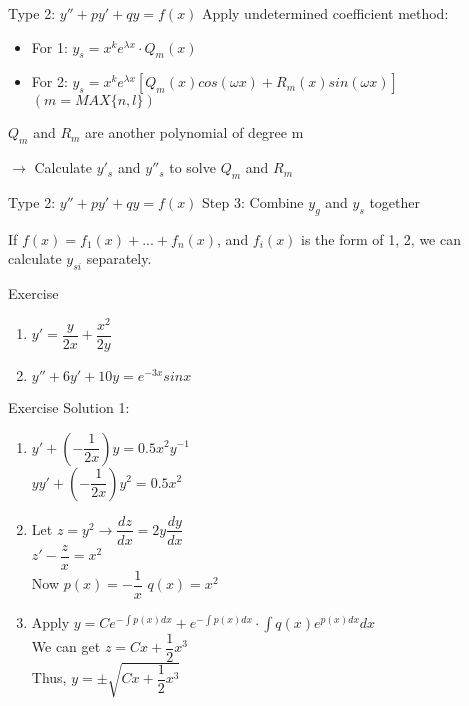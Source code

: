 \begin{frame}{Type 2: $y'' + py' + qy = f(x)$}
    Apply undetermined coefficient method:
    \begin{itemize}
        \item For 1: $y_s = x^k e^{\lambda x}\cdot Q_m(x) $
        \item For 2: $y_s = x^k e^{\lambda x}[Q_m(x)cos(\omega x) + R_m(x) sin(\omega x)]$\
              $(m = MAX\{n ,l\})$
    \end{itemize}
    $Q_m$ and $R_m$ are another polynomial of degree m

    $\rightarrow$ Calculate $y'_s$ and $y''_s$ to solve $Q_m$ and $R_m$

\end{frame}





\begin{frame}{Type 2: $y'' + py' + qy = f(x)$}
    Step 3: Combine $y_g$ and $y_s$ together

    If $f(x) = f_1(x) + ... + f_n(x)$, and $f_i(x)$ is the form of 1, 2, we can calculate $y_{si}$ separately.
\end{frame}





\begin{frame}{Exercise}
    \begin{enumerate}
        \item $y' = \dfrac{y}{2x} + \dfrac{x^2}{2y}$
        \item $y'' + 6y' + 10y = e^{-3x}sinx$
    \end{enumerate}
\end{frame}





\begin{frame}{Exercise}
    Solution 1:

    \begin{enumerate}
        \item $y' + (-\dfrac{1}{2x})y = 0.5x^2y^{-1}$\\$yy' + (-\dfrac{1}{2x})y^2 = 0.5 x^2$\\
        \item Let $z = y^2 \rightarrow \dfrac{dz}{dx} = 2y \dfrac{dy}{dx}$\\ $z' - \dfrac{z}{x} = x^2$\\Now $p(x) = -\dfrac{1}{x}$ $q(x) = x^2$\\
        \item Apply $y = Ce^{-\int p(x)dx} + e^{-\int p(x)dx}\cdot \int q(x)e^{p(x)dx} dx$ \\We can get $z = Cx + \dfrac{1}{2}x^3$\\Thus, $y = \pm \sqrt{Cx + \dfrac{1}{2}x^3}$\\
    \end{enumerate}
\end{frame}





